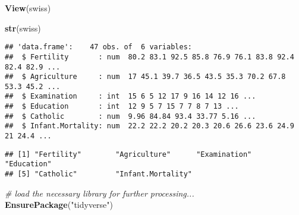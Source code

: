 \documentclass[]{article}
\newenvironment{Shaded}{\begin{snugshade}}{\end{snugshade}}
\newcommand{\CommentTok}[1]{\textcolor[rgb]{0.56,0.35,0.01}{\textit{#1}}}
\newcommand{\KeywordTok}[1]{\textcolor[rgb]{0.13,0.29,0.53}{\textbf{#1}}}
\newcommand{\NormalTok}[1]{#1}
\newcommand{\OperatorTok}[1]{\textcolor[rgb]{0.81,0.36,0.00}{\textbf{#1}}}
\newcommand{\StringTok}[1]{\textcolor[rgb]{0.31,0.60,0.02}{#1}}
\begin{document}
\begin{Shaded}
\begin{Highlighting}[]
\KeywordTok{View}\NormalTok{(swiss)}

\KeywordTok{str}\NormalTok{(swiss)}
\end{Highlighting}
\end{Shaded}

\begin{verbatim}
## 'data.frame':    47 obs. of  6 variables:
##  $ Fertility       : num  80.2 83.1 92.5 85.8 76.9 76.1 83.8 92.4 82.4 82.9 ...
##  $ Agriculture     : num  17 45.1 39.7 36.5 43.5 35.3 70.2 67.8 53.3 45.2 ...
##  $ Examination     : int  15 6 5 12 17 9 16 14 12 16 ...
##  $ Education       : int  12 9 5 7 15 7 7 8 7 13 ...
##  $ Catholic        : num  9.96 84.84 93.4 33.77 5.16 ...
##  $ Infant.Mortality: num  22.2 22.2 20.2 20.3 20.6 26.6 23.6 24.9 21 24.4 ...
\end{verbatim}

\begin{Shaded}
\end{Shaded}

\begin{verbatim}
## [1] "Fertility"        "Agriculture"      "Examination"      "Education"       
## [5] "Catholic"         "Infant.Mortality"
\end{verbatim}

\begin{Shaded}
\begin{Highlighting}[]
\CommentTok{# load the necessary library for further processing...}
\KeywordTok{EnsurePackage}\NormalTok{(}\StringTok{"tidyverse"}\NormalTok{)}
\end{Highlighting}
\end{Shaded}
\end{document}
